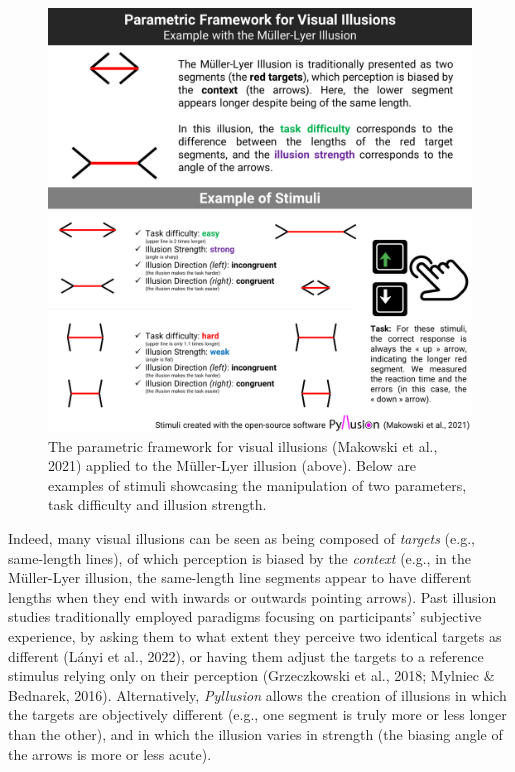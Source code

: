 \documentclass[
  man,floatsintext]{apa6}
\begin{document}
\begin{figure}
\includegraphics[width=1\linewidth]{figures/Figure1} \caption{The parametric framework for visual illusions (Makowski et al., 2021) applied to the Müller-Lyer illusion (above). Below are examples of stimuli showcasing the manipulation of two parameters, task difficulty and illusion strength.}\label{fig:unnamed-chunk-2}
\end{figure}

Indeed, many visual illusions can be seen as being composed of \emph{targets} (e.g., same-length lines), of which perception is biased by the \emph{context} (e.g., in the Müller-Lyer illusion, the same-length line segments appear to have different lengths when they end with inwards or outwards pointing arrows). Past illusion studies traditionally employed paradigms focusing on participants' subjective experience, by asking them to what extent they perceive two identical targets as different (Lányi et al., 2022), or having them adjust the targets to a reference stimulus relying only on their perception (Grzeczkowski et al., 2018; Mylniec \& Bednarek, 2016). Alternatively, \emph{Pyllusion} allows the creation of illusions in which the targets are objectively different (e.g., one segment is truly more or less longer than the other), and in which the illusion varies in strength (the biasing angle of the arrows is more or less acute).
\end{document}

